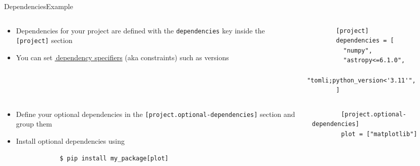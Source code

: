\begin{splitframe}[fragile]{Dependencies}{Example}
  \begin{columns}[t,onlytextwidth]
    \begin{column}{0.58\textwidth}
      \begin{itemize}
        \setlength{\itemsep}{1em}
        \item Dependencies for your project are defined with the \texttt{dependencies}
          key inside the \texttt{[project]} section
        \item You can set \href{https://packaging.python.org/en/latest/specifications/dependency-specifiers/}{{\footnotesize{\faExternalLink*}}\,dependency specifiers}
          (aka constraints) such as versions
      \end{itemize}
    \end{column}
    \hfill
    \begin{column}{0.38\textwidth}
      \begin{verbatim}
        [project]
        dependencies = [
          "numpy",
          "astropy<=6.1.0",
          "tomli;python_version<'3.11'",
        ]
      \end{verbatim}
    \end{column}
  \end{columns}
  \vspace{1em}
  \begin{columns}[t,onlytextwidth]
    \begin{column}{0.58\textwidth}
      \begin{itemize}
        \setlength{\itemsep}{1em}
        \item Define your optional dependencies in the \texttt{[project.optional-dependencies]} section
          and group them
        \item Install optional dependencies using
          \begin{verbatim}
            $ pip install my_package[plot]
          \end{verbatim}
      \end{itemize}
    \end{column}
    \hfill
    \begin{column}{0.38\textwidth}
      \begin{verbatim}
        [project.optional-dependencies]
        plot = ["matplotlib"]
      \end{verbatim}
    \end{column}
  \end{columns}

\end{splitframe}
